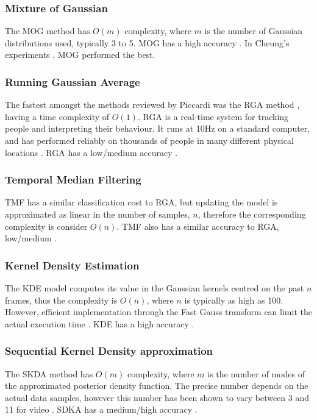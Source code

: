 \subsubsection{Mixture of Gaussian}
The MOG method \cite{Stauffer1999} has $O(m)$ complexity, where $m$ is the number of Gaussian distributions used, typically 3 to 5. MOG has a high accuracy \cite{Piccardi2004}. In Cheung's experiments \cite{Cheung2007}, MOG performed the best.\\

\subsubsection{Running Gaussian Average}
The fastest amongst the methods reviewed by Piccardi was the RGA method \cite{Wren1997,Koller1994}, having a time complexity of $O(1)$. RGA is a real-time system for tracking people and interpreting their behaviour. It runs at 10Hz on a standard computer, and has performed reliably on thousands of people in many
different physical locations \cite{Wren1997}. RGA has a low/medium accuracy \cite{Piccardi2004}.\\

\subsubsection{Temporal Median Filtering}
TMF \cite{Lo2001,Cucchiara2003} has a similar classification cost to RGA, but updating the  model is approximated as linear in the number of samples, $n$, therefore the corresponding complexity is consider $O(n)$. TMF also has a similar accuracy to RGA, low/medium \cite{Piccardi2004}.\\

\subsubsection{Kernel Density Estimation}
The KDE \cite{Elgammal2000} model computes its value in the Gaussian kernels centred on the past $n$ frames, thus the complexity is $O(n)$, where $n$ is typically as high as 100. However, efficient implementation through the Fast Gauss transform can limit the actual execution time \cite{Elgammal2003}. KDE has a high accuracy \cite{Piccardi2004}.\\

\subsubsection{Sequential Kernel Density approximation}
The SKDA \cite{Han2004} method has $O(m)$ complexity, where $m$ is the number of modes of the approximated posterior density function. The precise number depends on the actual data samples, however this number has been shown to vary between 3 and 11 for video \cite{Han2007}. SDKA has a medium/high accuracy \cite{Piccardi2004}.

